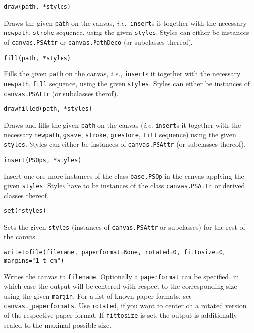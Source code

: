 \verb|draw(path, *styles)|

Draws the given \verb|path| on the canvas, \textit{i.e.}, 
\verb|insert|s it together with the necessary \verb|newpath|,
\verb|stroke| sequence, using the given \verb|styles|. Styles can
either be instances of \verb|canvas.PSAttr| or \verb|canvas.PathDeco|
(or subclasses thereof).

\verb|fill(path, *styles)|

Fills the given \verb|path| on the canvas, \textit{i.e.},
\verb|insert|s it together with the necessary \verb|newpath|,
\verb|fill| sequence, using the given \verb|styles|. Styles can
either be instances of \verb|canvas.PSAttr| (or subclasses therof).

\verb|drawfilled(path, *styles)|

Draws and fills the given \verb|path| on the canvas (\textit{i.e.}
\verb|insert|s it together with the necessary \verb|newpath|,
\verb|gsave|, \verb|stroke|, \verb|grestore|, \verb|fill| sequence)
using the given \verb|styles|. Styles can either be instances of
\verb|canvas.PSAttr| (or subclasses thereof).



\verb|insert(PSOps, *styles)|

Insert one ore more instances of the class \verb|base.PSOp| in the
canvas applying the given \verb|styles|.  Styles have to be instances
of the class \verb|canvas.PSAttr| or derived classes thereof.

\verb|set(*styles)|

Sets the given \verb|styles| (instances of \verb|canvas.PSAttr| or
subclasses) for the rest of the canvas.

\verb|writetofile(filename, paperformat=None, rotated=0, fittosize=0, margins="1 t cm")|

Writes the canvas to \verb|filename|. Optionally a \verb|paperformat|
can be specified, in which case the output will be centered with
respect to the corresponding size using the given \verb|margin|. For a
list of known paper formats, see \verb|canvas._paperformats|. Use
\verb|rotated|, if you want to center on a rotated version of the
respective paper format. If \verb|fittosize| is set, the output is
additionally scaled to the maximal possible size.


